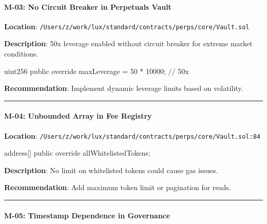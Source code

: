 \documentclass[
]{article}
\newenvironment{Shaded}{}{}
\newcommand{\NormalTok}[1]{#1}
\begin{document}
\paragraph{M-03: No Circuit Breaker in Perpetuals
Vault}\label{m-03-no-circuit-breaker-in-perpetuals-vault}

\textbf{Location}:
\texttt{/Users/z/work/lux/standard/contracts/perps/core/Vault.sol}

\textbf{Description}: 50x leverage enabled without circuit breaker for
extreme market conditions.

\begin{Shaded}
\begin{Highlighting}[]
\NormalTok{uint256 public override maxLeverage = 50 * 10000; // 50x}
\end{Highlighting}
\end{Shaded}

\textbf{Recommendation}: Implement dynamic leverage limits based on
volatility.

\begin{center}\rule{0.5\linewidth}{0.5pt}\end{center}

\paragraph{M-04: Unbounded Array in Fee
Registry}\label{m-04-unbounded-array-in-fee-registry}

\textbf{Location}:
\texttt{/Users/z/work/lux/standard/contracts/perps/core/Vault.sol:84}

\begin{Shaded}
\begin{Highlighting}[]
\NormalTok{address[] public override allWhitelistedTokens;}
\end{Highlighting}
\end{Shaded}

\textbf{Description}: No limit on whitelisted tokens could cause gas
issues.

\textbf{Recommendation}: Add maximum token limit or pagination for
reads.

\begin{center}\rule{0.5\linewidth}{0.5pt}\end{center}

\paragraph{M-05: Timestamp Dependence in
Governance}\label{m-05-timestamp-dependence-in-governance}
\end{document}
